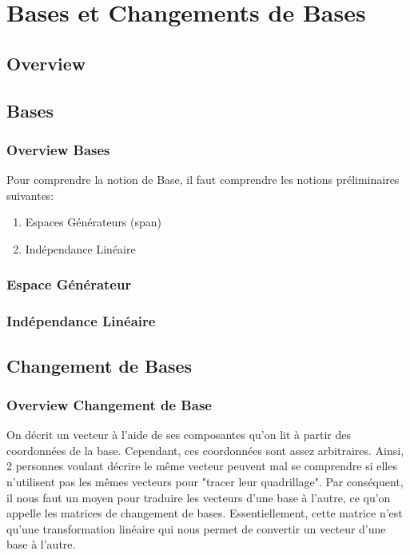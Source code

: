 \documentclass{article}
\begin{document}
\section{Bases et Changements de Bases}%
\label{sec:Bases et Changements de Bases}

\subsection{Overview}%
\label{sub:Overview}

\subsection{Bases}%
\label{sub:Bases}

\subsubsection{Overview Bases}%
\label{sub:Overview Bases}

Pour comprendre la notion de Base, il faut comprendre les notions préliminaires
suivantes:
\begin{enumerate}
    \item Espaces Générateurs (span)
    \item Indépendance Linéaire
\end{enumerate}

\subsubsection{Espace Générateur}%
\label{ssub:Espace Générateur}

\subsubsection{Indépendance Linéaire}%
\label{ssub:subsubsection name}

\subsection{Changement de Bases}%
\label{sub:Changement de Bases}

\subsubsection{Overview Changement de Base}%
\label{sub:Overview}

On décrit un vecteur à l'aide de ses composantes qu'on lit à partir des
coordonnées de la base. Cependant, ces coordonnées sont assez arbitraires.
Ainsi, 2 personnes voulant décrire le même vecteur peuvent mal se comprendre
si elles n'utilisent pas les mêmes vecteurs pour "tracer leur quadrillage".
Par conséquent, il nous faut un moyen pour traduire les vecteurs d'une base
à l'autre, ce qu'on appelle les matrices de changement de bases. Essentiellement,
cette matrice n'est qu'une transformation linéaire qui nous permet de convertir
un vecteur d'une base à l'autre.
\end{document}
